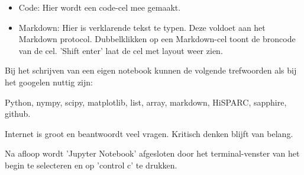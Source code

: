 \begin{itemize}
\item Code: Hier wordt een code-cel mee gemaakt.
\item Markdown: Hier is verklarende tekst te typen. Deze voldoet aan het Markdown protocol. Dubbelklikken op een Markdown-cel 
toont de broncode van de cel. 'Shift enter' laat de cel met layout weer zien.
\end{itemize}

Bij het schrijven van een eigen notebook kunnen de volgende trefwoorden als bij het googelen nuttig zijn:

Python, nympy, scipy, matplotlib, list, array, markdown, HiSPARC, sapphire, github.

Internet is groot en beantwoordt veel vragen. Kritisch denken blijft van belang. 

Na afloop wordt 'Jupyter Notebook' afgesloten door 
het terminal-venster van het begin te selecteren en op 'control c' te drukken.


